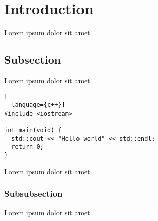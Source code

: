 \section{Introduction}
Lorem ipsum dolor sit amet.

\subsection{Subsection}
Lorem ipsum dolor sit amet.

\begin{lstlisting}[
  language={c++}]
#include <iostream>

int main(void) {
  std::cout << "Hello world" << std::endl;
  return 0;
}
\end{lstlisting}
Lorem ipsum dolor sit amet.

\subsubsection{Subsubsection}
Lorem ipsum dolor sit amet.

